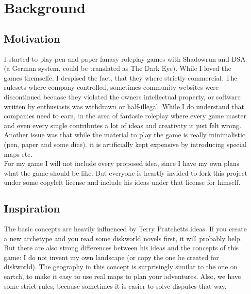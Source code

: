 \chapter{Background}
\section{Motivation}
I started to play pen and paper fanasy roleplay games with Shadowrun and DSA (a German system, could be translated as The Dark Eye). While I loved the games themselfe, I despised the fact, that they where strictly commercial. The rulesets where company controlled, sometimes community websites were discontinued becuase they violated the owners intellectual property, or software written by enthusiasts was withdrawn or half-illegal. While I do understand that companies need to earn, in the area of fantasie roleplay where every game master and even every single contributes a lot of ideas and creativity it just felt wrong. Another issue was that while the material to play the game is really minimalistic (pen, paper and some dice), it is artificially kept expensive by introducing special maps etc.
\\
For my game I will not include every proposed idea, since I have my own plans what the game should be like. But everyone is heartly invided to fork this project under 
some copyleft license and include his ideas under that license for himself.

\section{Inspiration}
The basic concepts are heavily influenced by Terry Pratchetts ideas. If you create a new archetype and you read some diskworld novels first, it will probably help. But there are also strong differences between his ideas and the concepts of this game: I do not invent my own landscape (or copy the one he created for diskworld). The geography in this concept is surprisingly similar to the one on eartch, to make it easy to use real maps to plan your adventures. Also, we have some strict rules, because sometimes it is easier to solve disputes that way.
